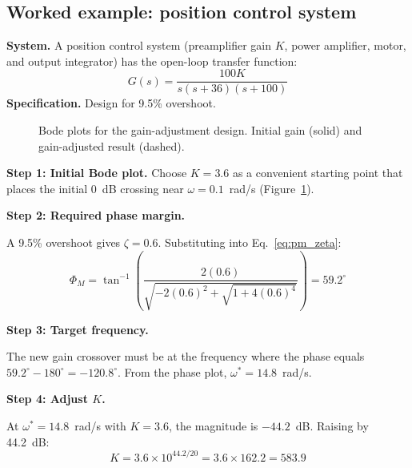 \documentclass[12pt]{article}
\newcommand{\figplaceholder}[2][3in]{%
  \begin{center}
  \fbox{\parbox{#1}{\centering\vspace{0.5in}\textit{[Figure: #2]}\vspace{0.5in}}}
  \end{center}
}
\begin{document}
\subsection{Worked example: position control system}
\label{sec:design_example}

\textbf{System.}  A position control system (preamplifier gain $K$, power
amplifier, motor, and output integrator) has the open-loop transfer function:
\begin{equation}
  G(s) = \frac{100K}{s(s+36)(s+100)}
  \label{eq:ex2_loop}
\end{equation}
\textbf{Specification.}  Design for 9.5\% overshoot.

\begin{figure}[htbp]
  \figplaceholder[5.5in]{Bode magnitude and phase for $G(s) = 100K/[s(s+36)(s+100)]$.
    Show the initial curve ($K = 3.6$, magnitude starting at 0~dB near
    $\omega = 0.1$~rad/s) and the gain-adjusted curve ($K = 583.9$, shifted
    up by 44.2~dB).  Mark $\omega^* = 14.8$~rad/s on the phase plot where
    phase $= -120.8^\circ$ and on the magnitude plot where the adjusted curve
    crosses 0~dB. [Nise Fig.~11.3]}
  \caption{Bode plots for the gain-adjustment design.  Initial gain (solid)
    and gain-adjusted result (dashed).}
  \label{fig:ex_design}
\end{figure}

\textbf{Step 1: Initial Bode plot.}  Choose $K = 3.6$ as a convenient starting
point that places the initial 0~dB crossing near $\omega = 0.1$~rad/s
(Figure~\ref{fig:ex_design}).

\textbf{Step 2: Required phase margin.}

A 9.5\% overshoot gives $\zeta = 0.6$.  Substituting into
Eq.~\eqref{eq:pm_zeta}:
\[
  \Phi_M = \tan^{-1}\!\left(\frac{2(0.6)}{\sqrt{-2(0.6)^2+\sqrt{1+4(0.6)^4}}}\right) = 59.2^\circ
\]

\textbf{Step 3: Target frequency.}

The new gain crossover must be at the frequency where the phase equals
$59.2^\circ - 180^\circ = -120.8^\circ$.  From the phase plot,
$\omega^* = 14.8$~rad/s.

\textbf{Step 4: Adjust $K$.}

At $\omega^* = 14.8$~rad/s with $K = 3.6$, the magnitude is $-44.2$~dB.
Raising by 44.2~dB:
\[
  K = 3.6 \times 10^{44.2/20} = 3.6 \times 162.2 = 583.9
\]
\end{document}
